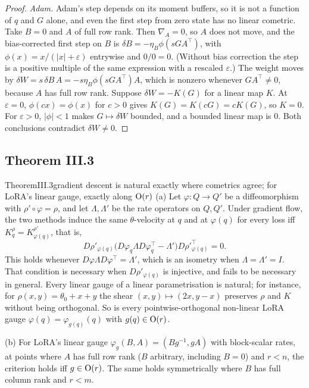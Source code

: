 \begin{proof}
\emph{Adam.} Adam's step depends on its moment buffers, so it is not a function of $q$ and $G$ alone, and even the first
step from zero state has no linear cometric. Take $B=0$ and $A$ of full row rank. Then $\nabla_A=0$, so $A$ does not
move, and the bias-corrected first step on $B$ is $\delta B=-\eta_B\phi(sGA^\top)$, with $\phi(x)=x/(\lvert x\rvert+\varepsilon)$
entrywise and $0/0=0$. (Without bias correction the step is a positive multiple of the same expression with a rescaled
$\varepsilon$.) The weight moves by $\delta W=s\,\delta B\,A=-s\eta_B\phi(sGA^\top)A$, which is nonzero whenever
$GA^\top\ne0$, because $A$ has full row rank. Suppose $\delta W=-K(G)$ for a linear map $K$. At $\varepsilon=0$,
$\phi(cx)=\phi(x)$ for $c>0$ gives $K(G)=K(cG)=cK(G)$, so $K=0$. For $\varepsilon>0$, $\lvert\phi\rvert<1$ makes
$G\mapsto\delta W$ bounded, and a bounded linear map is $0$. Both conclusions contradict $\delta W\ne0$.
\end{proof}

\subsection{Theorem III.3}\label{proof:III.3}

\begin{restate}{Theorem}{III.3}{gradient descent is natural exactly where cometrics agree; for LoRA's linear gauge, exactly along $\mathrm{O}(r)$}
(a) Let $\varphi:Q\to Q'$ be a diffeomorphism with $\rho'\circ\varphi=\rho$, and let $\Lambda,\Lambda'$ be the rate
operators on $Q,Q'$. Under gradient flow, the two methods induce the same $\theta$-velocity at $q$ and at $\varphi(q)$
for every loss iff $K^\rho_q=K^{\rho'}_{\varphi(q)}$, that is,
\[D\rho'_{\varphi(q)}\big(D\varphi_q\Lambda D\varphi_q^\top-\Lambda'\big)D\rho'^\top_{\varphi(q)}=0.\]
This holds whenever $D\varphi\Lambda D\varphi^\top=\Lambda'$, which is an isometry when $\Lambda=\Lambda'=I$. That
condition is necessary when $D\rho'_{\varphi(q)}$ is injective, and fails to be necessary in general. Every linear gauge
of a linear parametrisation is natural; for instance, for $\rho(x,y)=\theta_0+x+y$ the shear $(x,y)\mapsto(2x,y-x)$
preserves $\rho$ and $K$ without being orthogonal. So is every pointwise-orthogonal non-linear LoRA gauge
$\varphi(q)=\varphi_{g(q)}(q)$ with $g(q)\in\mathrm{O}(r)$.

(b) For LoRA's linear gauge $\varphi_g(B,A)=(Bg^{-1},gA)$ with block-scalar rates, at points where $A$ has full row rank
($B$ arbitrary, including $B=0$) and $r<n$, the criterion holds iff $g\in\mathrm{O}(r)$. The same holds symmetrically where $B$
has full column rank and $r<m$.
\end{restate}


